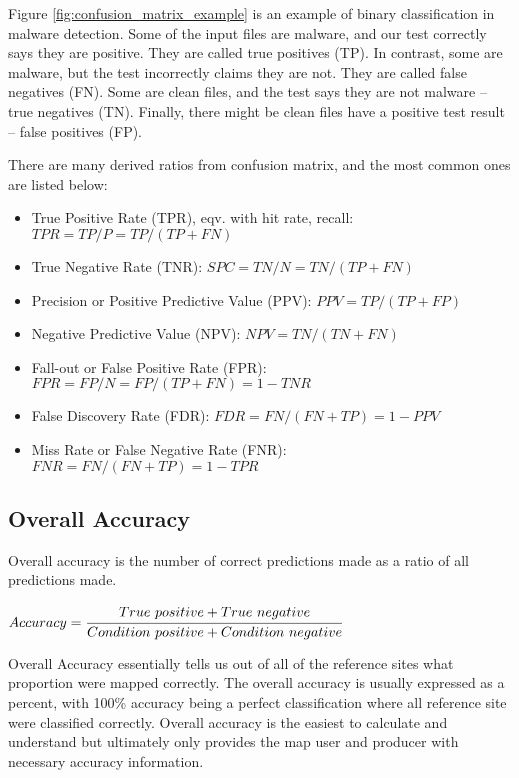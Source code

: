 Figure \ref{fig:confusion_matrix_example} is an example of binary classification in malware detection. 
Some of the input files are malware, and our test correctly says they are positive. 
They are called true positives (TP). 
In contrast, some are malware, but the test incorrectly claims they are not. 
They are called false negatives (FN). 
Some are clean files, and the test says they are not malware – true negatives (TN). 
Finally, there might be clean files have a positive test result – false positives (FP).

There are many derived ratios from confusion matrix, and the most common ones are listed below:

\begin{itemize}
    \item True Positive Rate (TPR), eqv. with hit rate, recall: $TPR = TP/P = TP/(TP + FN)$
    \item True Negative Rate (TNR): $SPC = TN/N = TN/(TP + FN)$
    \item Precision or Positive Predictive Value (PPV): $PPV = TP/(TP + FP)$
    \item Negative Predictive Value (NPV): $NPV = TN/(TN + FN)$
    \item Fall-out or False Positive Rate (FPR): $FPR = FP/N = FP/(TP + FN) = 1 - TNR$
    \item False Discovery Rate (FDR): $FDR = FN/(FN + TP) = 1 - PPV$
    \item Miss Rate or False Negative Rate (FNR): $FNR = FN/(FN + TP) = 1 - TPR$
\end{itemize}

\subsection{Overall Accuracy}

Overall accuracy is the number of correct predictions made as a ratio of all predictions made.

\begin{center}
    ${Accuracy} =  \cfrac{True\ positive + True\ negative}{Condition\ positive + Condition\ negative}$
\end{center}

Overall Accuracy essentially tells us out of all of the reference sites what proportion were mapped correctly. 
The overall accuracy is usually expressed as a percent, with 100\% accuracy being a perfect classification where all reference site were classified correctly. 
Overall accuracy is the easiest to calculate and understand but ultimately only provides the map user and producer with necessary accuracy information.

